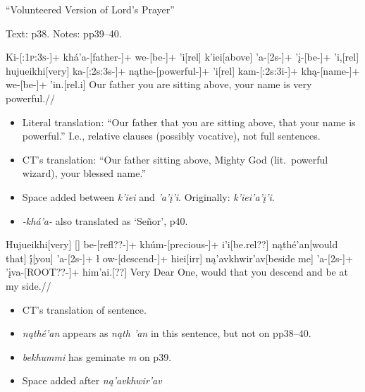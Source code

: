 \documentclass[12pt]{article}
\newlength{\schwawidth}
\newlength{\schwaheight}
\newcommand{\x}{%
	\settowidth{\schwawidth}{\it e}%
	\settoheight{\schwaheight}{\it e}%
	\makebox[\schwawidth][r]{%
	\raisebox{\schwaheight}{%
	\turnbox{180}{e}}}%
	}
\newcommand{\lex}{\raisebox{-.3ex}{\scriptsize\sc l}}
\newcommand{\ct}[1]{\raisebox{-.3ex}{\scriptsize\sc#1}}
\begin{document}
\def\writeln#1{\immediate\write16{#1}}

\begin{center}
\large ``Volunteered Version of Lord's Prayer''
\end{center}
Text: p38. Notes: pp39--40. %

\bigskip

\bigskip
\ex
\begingl
Ki-[\textsc{:1p:3s}-]+  kh\'a'a-[father-]+  we-[be-]+ 'i[{\sc rel}]
k'iei[above\lex]
'a-[\sc2s-]+ '\k i-[be\lex-]+ 'i,[{\sc rel}]
hujueikhi[very\lex]
ka-[\sc:2s:3s-]+  n\k athe-[powerful-]+  'i[\sc rel]
kam-[\sc:2s:3i-]+ kh\k a-[name-]+ we-[be-]+ 'in.[\sc rel.i]
\endilg
\glft Our father you are sitting above, your name is very powerful.//
\endgl
{\medskip\footnotesize

\begin{itemize}
\item Literal translation: ``Our father that you are sitting above, that your name is powerful.''  I.e., relative clauses (possibly vocative), not full sentences.
\item CT's translation: ``Our father sitting above, Mighty God (lit.\ powerful wizard), your blessed name.''
\item Space added between \emph{k'iei} and \emph{'a'\k i'i}.  Originally: \emph{k'iei'a'\k i'i}.
\item \emph{-kh\'a'a-} also translated as `Se\~nor', p40.
\end{itemize}
}
\xe

\ex
\begingl
Hujueikhi[very]
	\hspace{.75em}[]
be-[\sc refl??-]+
kh\'um-[precious\lex-]+
i'i[be\sc.rel??]
n\k ath\'e'an[{would that}\ct{39}]
{\k{\'i}}[you]
'a-[\sc2s-]+
\l\x ow-[descend-]+
hiei[\sc irr]
n\k a'avkhwir'av[{beside me}\ct{39}]
'a-[\sc2s-]+
'\k iva-[ROOT??-]+
him'ai.[??]
\endilg
\glft Very Dear One, would that you descend and be at my side.//
\endgl
{\medskip\footnotesize

\begin{itemize}
\item CT's translation of sentence.
\item \emph{n\k ath\'e'an} appears as \emph{n\k ath\makebox[0pt][l]{\'{}}\x'an} in this sentence, but not on pp38--40.
\item \emph{bekhummi} has geminate \emph m on p39.
\item Space added after \emph{n\k a'avkhwir'av}
\end{itemize}
}
\xe
\end{document}
